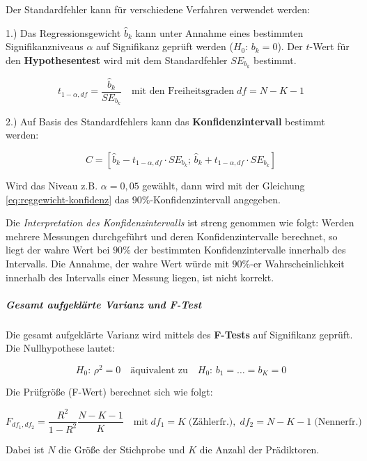 \documentclass{article}
\numberwithin{equation}{section}
\begin{document}
Der Standardfehler kann für verschiedene Verfahren verwendet werden:

1.) Das Regressionsgewicht $\hat b_k$ kann unter Annahme eines bestimmten Signifikanzniveaus $\alpha$ auf Signifikanz geprüft werden ($H_0: \, b_k = 0$). Der $t$-Wert für den \textbf{Hypothesentest} wird mit dem Standardfehler $SE_{b_k}$ bestimmt.

\begin{equation}
t_{1-\alpha,df} = \frac{\hat b_k}{SE_{b_k}} \quad \text{mit den Freiheitsgraden} \; df = N-K-1
\end{equation}

2.) Auf Basis des Standardfehlers kann das \textbf{Konfidenzintervall} bestimmt werden:

\begin{equation}
\label{eq:reggewicht-konfidenz}
C = \left[ \hat b_k - t_{1-\alpha,df} \cdot SE_{b_k} ; \, \hat b_k + t_{1-\alpha,df} \cdot SE_{b_k} \right]
\end{equation}

Wird das Niveau z.B. $\alpha = 0,05$ gewählt, dann wird mit der Gleichung \ref{eq:reggewicht-konfidenz} das $90\%$-Konfidenzintervall angegeben.

Die \emph{Interpretation des Konfidenzintervalls} ist streng genommen wie folgt: Werden mehrere Messungen durchgeführt und deren Konfidenzintervalle berechnet, so liegt der wahre Wert bei $90\%$ der bestimmten Konfidenzintervalle innerhalb des Intervalls. Die Annahme, der wahre Wert würde mit $90\%$-er Wahrscheinlichkeit innerhalb des Intervalls einer Messung liegen, ist nicht korrekt.

\subparagraph{Gesamt aufgeklärte Varianz und F-Test}
\label{sec:var-f-test}

Die gesamt aufgeklärte Varianz wird mittels des \textbf{F-Tests} auf Signifikanz geprüft. Die Nullhypothese lautet:

\begin{equation}
H_0: \, \rho^2 = 0 \quad \text{äquivalent zu} \quad H_0: \, b_1 = \dots = b_K = 0
\end{equation}

Die Prüfgröße (F-Wert) berechnet sich wie folgt:

\begin{equation}
F_{df_1,df_2} = \frac{R^2}{1-R^2} \frac{N-K-1}{K} \quad \text{mit} \; df_1 = K \;\text{(Zählerfr.)},\; df_2 = N-K-1 \;\text{(Nennerfr.)}
\end{equation}

Dabei ist $N$ die Größe der Stichprobe und $K$ die Anzahl der Prädiktoren.
\end{document}
